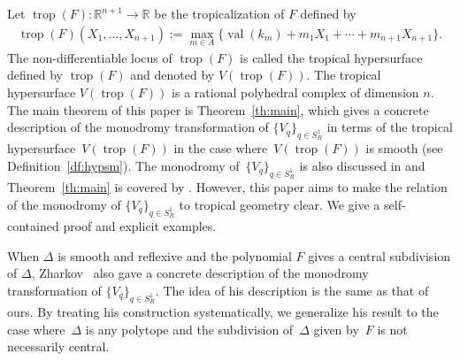 \documentclass[10pt,a4paper]{amsart}
\numberwithin{equation}{section}
\begin{document}
Let $\operatorname{trop}(F) \colon {\mathbb R}^{n+1} \to {\mathbb R}$ be the tropicalization of $F$ def\/ined by
\begin{gather}\label{eq:trp}
\operatorname{trop}(F)(X_1, \dots , X_{n+1}):=\max_{m \in A} \big\{{\operatorname{val}}(k_m)+m_1X_1+ \cdots +m_{n+1}X_{n+1} \big\}.
\end{gather}
The non-dif\/ferentiable locus of $\operatorname{trop}(F)$ is called the tropical hypersurface def\/ined by $\operatorname{trop}(F)$
and denoted by $V(\operatorname{trop}(F))$. The tropical hypersurface $V(\operatorname{trop}(F))$ is a rational polyhedral complex of dimension $n$.
The main theorem of this paper is Theorem~\ref{th:main}, which gives a concrete description of the monodromy transformation of $\{V_q\}_{q \in S_R^1}$ in terms of the tropical hypersur\-fa\-ce~$V(\operatorname{trop}(F))$ in the case where~$V(\operatorname{trop}(F))$ is smooth (see Def\/inition~\ref{df:hypsm}). The monodromy of~$\{V_q\}_{q \in S_R^1}$ is also discussed in \cite[Appendix~B.2]{DKK} and Theorem~\ref{th:main} is covered by \cite[Proposition~B.17]{DKK}. However, this paper aims to make the relation of the monodromy of $\{V_q\}_{q \in S_R^1}$ to tropical geometry clear. We give a self-contained proof and explicit examples.

When $\Delta$ is smooth and ref\/lexive and the polynomial $F$ gives a central subdivision of $\Delta$, Zharkov~\cite{MR1738179} also gave a concrete description of the monodromy transformation of $\{V_q\}_{q \in S_R^1}$. The idea of his description is the same as that of ours. By treating his construction systematically, we generalize his result to the case where~$\Delta$ is any polytope and the subdivision of~$\Delta$ given by~$F$ is not necessarily central.
\end{document}
